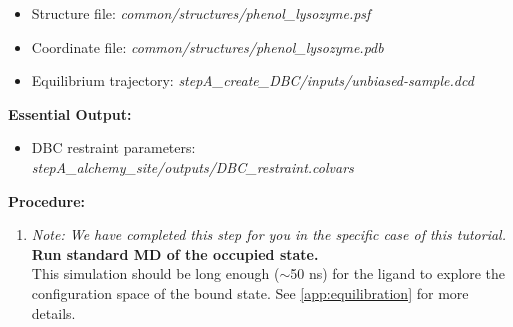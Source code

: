 \documentclass[9pt,tutorial]{Styling/livecoms}
\newcommand{\filepath}[1]{\textit{#1}}
\begin{document}
    \begin{itemize}
        \item Structure file: \filepath{common/structures/phenol\_lysozyme.psf} \item Coordinate file: \filepath{common/structures/phenol\_lysozyme.pdb}
        \item Equilibrium trajectory: \filepath{stepA\_create\_DBC/inputs/unbiased-sample.dcd}
    \end{itemize}
    \textbf{Essential Output:}
    \begin{itemize}
        \item DBC restraint parameters: \filepath{stepA\_alchemy\_site/outputs/DBC\_restraint.colvars}
    \end{itemize}
    \textbf{Procedure:}
    \begin{enumerate}
    \item \textit{Note: We have completed this step for you in the specific case of this tutorial.} \textbf{Run standard MD of the occupied state.}\label{step:unbiased}\\
    This simulation should be long enough ($\sim$50 ns) for the ligand to explore the configuration space of the bound state. See \ref{app:equilibration} for more details.
    

\end{enumerate}
\end{document}
